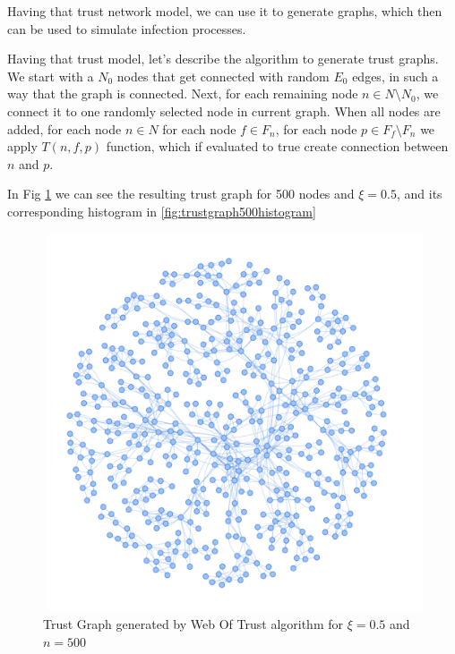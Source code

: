 Having that trust network model, we can use it to generate graphs, which then can be used to simulate infection processes. 

Having that trust model, let's describe the algorithm to generate trust graphs.
We start with a $N_0$ nodes that get connected with random $E_0$ edges, in such a way that the graph is connected. Next, for each remaining node $n \in N \setminus N_0$, we connect it to one randomly selected node in current graph. When all nodes are added, for each node $n \in N$ for each node $f \in F_n$, for each node $p \in F_f \setminus F_n$ we apply $T(n, f, p)$ function, which if evaluated to true create connection between $n$ and $p$.

In Fig \ref{fig:trustgraph500} we can see the resulting trust graph for 500 nodes and $\xi = 0.5$, and its corresponding histogram in \ref{fig:trustgraph500histogram}

\begin{figure}[h!]
    \includegraphics[width=\textwidth]{img/webOfTrust500Graph.png}
    \centering
    \caption{Trust Graph generated by Web Of Trust algorithm for $\xi=0.5$ and $n = 500$}
    \label{fig:trustgraph500}
\end{figure}

